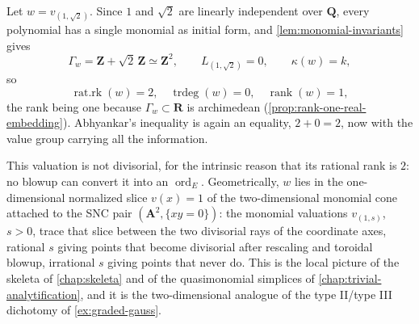 \begin{example}[A quasimonomial valuation with irrational weights:
$\alpha=(1,\sqrt2)$]
\label{ex:gallery-irrational}
Let $w=v_{(1,\sqrt2)}$. Since $1$ and $\sqrt2$ are linearly independent
over $\mathbf Q$, every polynomial has a single monomial as initial
form, and \cref{lem:monomial-invariants} gives
\[
 \Gamma_w=\mathbf Z+\sqrt2\,\mathbf Z\simeq\mathbf Z^2,
 \qquad
 L_{(1,\sqrt2)}=0,
 \qquad
 \kappa(w)=k,
\]
so
\[
 \operatorname{rat.rk}(w)=2,\quad
 \operatorname{trdeg}(w)=0,\quad
 \operatorname{rank}(w)=1 ,
\]
the rank being one because $\Gamma_w\subset\mathbf R$ is archimedean
(\cref{prop:rank-one-real-embedding}). Abhyankar's inequality is again an
equality, $2+0=2$, now with the value group carrying all the information.

This valuation is not divisorial, for the intrinsic reason that its
rational rank is $2$: no blowup can convert it into an
$\operatorname{ord}_E$. Geometrically, $w$ lies in the one-dimensional
normalized slice $v(x)=1$ of the two-dimensional monomial cone attached to
the SNC pair $(\mathbf A^2,\{xy=0\})$: the monomial valuations
$v_{(1,s)}$, $s>0$, trace that slice between the two divisorial rays of the coordinate
axes, rational $s$ giving points that become divisorial after rescaling
and toroidal blowup, irrational $s$ giving points that never do. This is
the local picture of the skeleta of \cref{chap:skeleta} and of the
quasimonomial simplices of \cref{chap:trivial-analytification}, and it is
the two-dimensional analogue of the type II/type III dichotomy of
\cref{ex:graded-gauss}.
\end{example}

